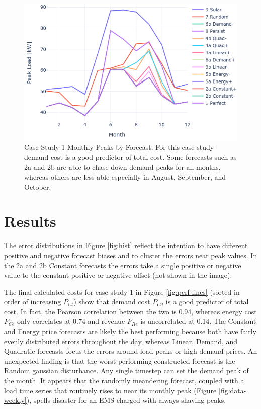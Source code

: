 \documentclass[conference]{IEEEtran}
\begin{document}
\begin{figure}
    \centering
    \includegraphics[width=1\linewidth]{monthly_peaks_lines.png}
    \caption{Case Study 1 Monthly Peaks by Forecast. For this case study demand cost is a good predictor of total cost. Some forecasts such as 2a and 2b are able to chase down demand peaks for all months, whereas others are less able especially in August, September, and October. }
    \label{fig:monthly-peaks-lines}
\end{figure}


\section{Results}

The error distributions in Figure \ref{fig:hist} reflect the intention to have different positive and negative forecast biases and to cluster the errors near peak values. In the 2a and 2b Constant forecasts the errors take a single positive or negative value to the constant positive or negative offset (not shown in the image).

The final calculated costs for case study 1 in Figure \ref{fig:perf-lines} (sorted in order of increasing $P_{Ct}$) show that demand cost $P_{Cd}$ is a good predictor of total cost. In fact, the Pearson correlation between the two is 0.94, whereas energy cost $P_{Ce}$ only correlates at 0.74 and revenue $P_{Re}$ is uncorrelated at 0.14. The Constant and Energy price forecasts are likely the best performing because both have fairly evenly distributed errors throughout the day, whereas Linear, Demand, and Quadratic forecasts focus the errors around load peaks or high demand prices. An unexpected finding is that the worst-performing constructed forecast is the Random gaussian disturbance. Any single timestep can set the demand peak of the month. It appears that the randomly meandering forecast, coupled with a load time series that routinely rises to near its monthly peak (Figure \ref{fig:data-weekly}), spells disaster for an EMS charged with always shaving peaks.
\end{document}
